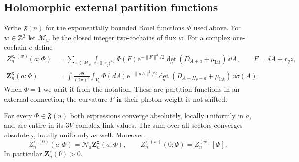 \subsection{Holomorphic external partition functions}
\label{subsec:external-holomorphy}

Write $\mathfrak F(n)$ for the exponentially bounded
Borel functions $\Phi$ used above. For $w\in\mathbb Z^3$ let
$\mathcal M_w$ be the closed integer two-cochains of
flux $w$. For a complex one-cochain $a$ define
\begin{align}
 Z_n^{\mathrm{x},(w)}(a;\Phi)
  &=\sum_{z\in\mathcal M_w}\int_{[0,r_q)^{\mathcal L_n}}
       \Phi(F)\mathrm e^{-\|F\|^2/2}
                \det_n(D_{A+a}+\mu_{\mathrm{lat}})\,\dd A,
       \qquad F=dA+r_qz,\label{eq:external-sector-source}\\
 \mathbf Z_n^{\mathrm{x}}(a;\Phi)
  &=\int\frac{\dd\theta}{(2\pi)^3}
       \int_{V_{\mathrm t}}\Phi(dA)\mathrm e^{-\|dA\|^2/2}
       \det_n(D_{A+H_\theta+a}+\mu_{\mathrm{lat}})\,\dd\sigma(A).
                                  \label{eq:external-averaged-source}
\end{align}
When $\Phi=1$ we omit it from the notation. These are
partition functions in an external connection; the
curvature $F$ in their photon weight is not shifted.

\begin{proposition}\label{prop:external-entire}
For every $\Phi\in\mathfrak F(n)$ both expressions
converge absolutely, locally uniformly in $a$, and are
entire in its $3V$ complex link values. The sum over
all sectors converges absolutely, locally uniformly
as well. Moreover
\begin{equation}\label{eq:external-source-zero-sector}
 Z_n^{\mathrm{x},(0)}(a;\Phi)
             =\mathcal N_n\mathbf Z_n^{\mathrm{x}}(a;\Phi),
 \qquad
 Z_n^{\mathrm{x},(w)}(0;\Phi)=Z_n^{(w)}[\Phi].
\end{equation}
In particular $\mathbf Z_n^{\mathrm{x}}(0)>0$.
\end{proposition}

